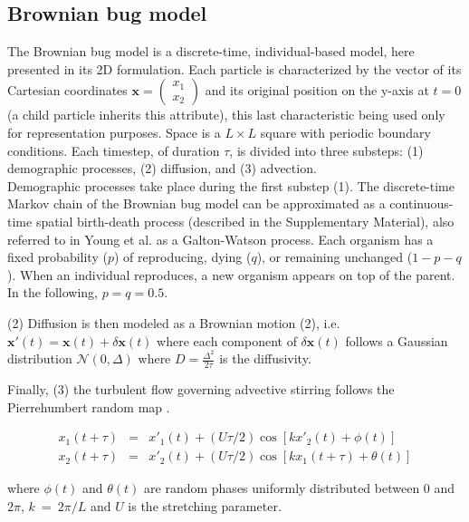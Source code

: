 \subsection*{Brownian bug model}
The Brownian bug model is a discrete-time, individual-based model, here presented in its 2D formulation. Each particle is characterized by the vector of its Cartesian coordinates $\boldsymbol{x}=\begin{pmatrix} 
      x_1\\ 
      x_2 
\end{pmatrix}$ and its original position on the y-axis at $t=0$ (a child particle inherits this attribute), this last characteristic being used only for representation purposes. Space is a $L\times L$ square with periodic boundary conditions. Each timestep, of duration $\tau$, is divided into three substeps: (1) demographic processes, (2) diffusion, and (3) advection. \\

Demographic processes take place during the first substep (1). The discrete-time Markov chain of the Brownian bug model can be approximated as a continuous-time spatial birth-death process (described in the Supplementary Material), also referred to in Young et al. \cite{young_reproductive_2001} as a Galton-Watson process. Each organism has a fixed probability ($p$) of reproducing, dying ($q$), or remaining unchanged ($1-p-q$). When an individual reproduces, a new organism appears on top of the parent. In the following, $p=q=0.5$.

(2) Diffusion is then modeled as a Brownian motion (2), i.e. $\boldsymbol{x'}(t)=\boldsymbol{x}(t)+\delta\boldsymbol{x}(t)$ where each component of $\delta\boldsymbol{x}(t)$ follows a Gaussian distribution $\mathcal{N}(0,\Delta)$ where $D=\frac{\Delta^2}{2\tau}$ is the diffusivity. 

Finally, (3) the turbulent flow governing advective stirring follows the Pierrehumbert random map \citep{pierrehumbert_tracer_1994}.

\begin{eqnarray}
 x_1(t+\tau)&=&x'_1(t)+(U\tau/2)\cos[kx'_2(t)+\phi(t)] \label{eq:map1} \\
 x_2(t+\tau)&=&x'_2(t)+(U\tau/2)\cos[kx_1(t+\tau)+\theta(t)] \label{eq:map2}
 \label{eq:pierrehumbert}
 \end{eqnarray}

 where $\phi(t)$ and $\theta(t)$ are random phases uniformly distributed between 0 and $2\pi$, $k~=~2\pi/L$ and $U$ is the stretching parameter. \\
 
